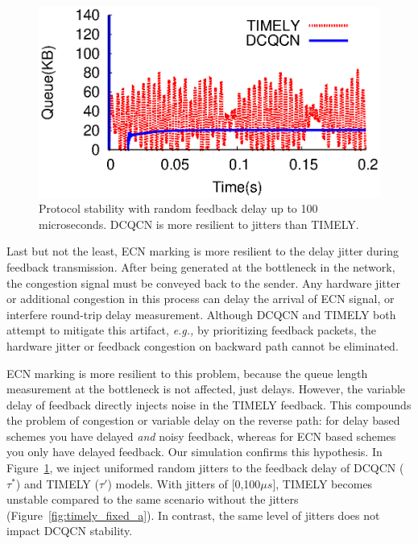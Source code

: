 \begin{figure}
\center
\includegraphics[width=0.7\columnwidth]{figures/variable_delay.eps}
\vspace{-1em}
\caption{Protocol stability with random feedback delay up to 100 microseconds. 
DCQCN is more resilient to jitters than TIMELY.}
\vspace{-1em}
\label{fig:variable_delay}
\end{figure}

Last but not the least, ECN marking is more resilient to the delay jitter during feedback 
transmission. After being generated at the bottleneck in the network, the congestion signal must
be conveyed back to the sender. Any hardware jitter or additional congestion in this process 
can delay the arrival of ECN signal, or interfere round-trip delay measurement.
Although DCQCN and TIMELY both attempt to mitigate this artifact, {\em e.g.,} by prioritizing
feedback packets, the hardware jitter or feedback congestion on backward path cannot be eliminated. 

ECN marking is more resilient to this problem, because the queue length measurement at the 
bottleneck is not affected, just delays. However, the variable delay
of feedback directly injects noise in the TIMELY feedback. This
compounds the problem of congestion or variable delay on the reverse
path: for delay based schemes you have
delayed \emph{and} noisy feedback, whereas for ECN based schemes you only have delayed feedback.
Our simulation confirms this hypothesis. In Figure~\ref{fig:variable_delay}, we inject 
uniformed random jitters to the feedback delay of DCQCN ($\tau^*$) 
and TIMELY ($\tau '$) models. With jitters of [0,100$\mu s$],
TIMELY becomes unstable compared to the same scenario without the jitters
(Figure~\ref{fig:timely_fixed_a}). In contrast, the same level of
jitters does not impact DCQCN stability.
\vspace{-0.5em}

